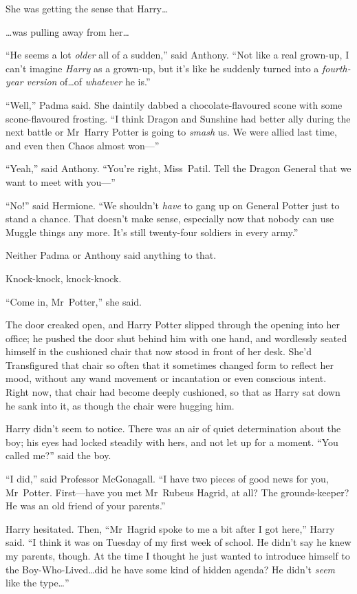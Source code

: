 She was getting the sense that Harry…

…was pulling away from her…

“He seems a lot \emph{older} all of a sudden,” said Anthony. “Not like a real grown-up, I can’t imagine \emph{Harry} as a grown-up, but it’s like he suddenly turned into a \emph{fourth-year version} of…of \emph{whatever} he is.”

“Well,” Padma said. She daintily dabbed a chocolate-flavoured scone with some scone-flavoured frosting. “I think Dragon and Sunshine had better ally during the next battle or Mr~Harry Potter is going to \emph{smash} us. We were allied last time, and even then Chaos almost won—”

“Yeah,” said Anthony. “You’re right, Miss~Patil. Tell the Dragon General that we want to meet with you—”

“No!” said Hermione. “We shouldn’t \emph{have} to gang up on General Potter just to stand a chance. That doesn’t make sense, especially now that nobody can use Muggle things any more. It’s still twenty-four soldiers in every army.”

Neither Padma or Anthony said anything to that.

\later

Knock-knock, knock-knock.

“Come in, Mr~Potter,” she said.

The door creaked open, and Harry Potter slipped through the opening into her office; he pushed the door shut behind him with one hand, and wordlessly seated himself in the cushioned chair that now stood in front of her desk. She’d Transfigured that chair so often that it sometimes changed form to reflect her mood, without any wand movement or incantation or even conscious intent. Right now, that chair had become deeply cushioned, so that as Harry sat down he sank into it, as though the chair were hugging him.

Harry didn’t seem to notice. There was an air of quiet determination about the boy; his eyes had locked steadily with hers, and not let up for a moment. “You called me?” said the boy.

“I did,” said Professor McGonagall. “I have two pieces of good news for you, Mr~Potter. First—have you met Mr~Rubeus Hagrid, at all? The grounds-keeper? He was an old friend of your parents.”

Harry hesitated. Then, “Mr~Hagrid spoke to me a bit after I got here,” Harry said. “I think it was on Tuesday of my first week of school. He didn’t say he knew my parents, though. At the time I thought he just wanted to introduce himself to the Boy-Who-Lived…did he have some kind of hidden agenda? He didn’t \emph{seem} like the type…”

